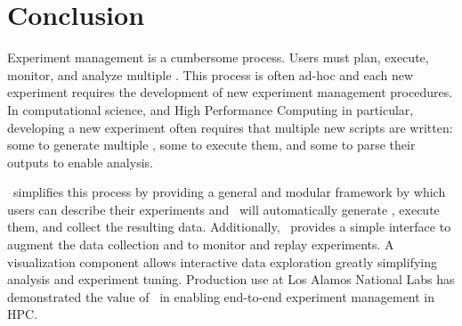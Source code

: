 \section{Conclusion}
\label{conclude}

Experiment management is a cumbersome process.  Users must plan, execute,
monitor, and analyze multiple \subs.  This process is often ad-hoc and
each new experiment requires the development of new experiment management
procedures.  In computational science, and High Performance Computing in
particular, developing a new experiment often requires that multiple new
scripts are written: some to generate multiple \subs, some to execute
them, and some to parse their outputs to enable analysis. 

\name\ simplifies this process by providing a general and modular framework
by which users can describe their experiments and \name\ will automatically
generate \subs, execute them, and collect the resulting data.  Additionally,
\name\ provides a simple interface to augment the data collection and to
monitor and replay experiments.  A visualization component allows interactive
data exploration greatly simplifying analysis and experiment tuning.  
Production use at Los Alamos National Labs has demonstrated the value of \name\
in enabling end-to-end experiment management in HPC.
